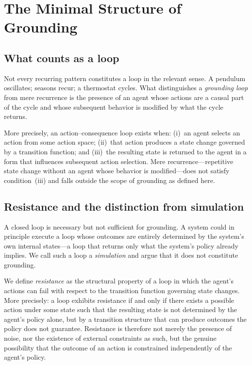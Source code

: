 \documentclass[11pt]{article}
\begin{document}
\section{The Minimal Structure of Grounding}
\label{sec:structure}

\subsection{What counts as a loop}
\label{sec:loop}

Not every recurring pattern constitutes a loop in the relevant sense.
A pendulum oscillates; seasons recur; a thermostat cycles. What
distinguishes a \emph{grounding loop} from mere recurrence is the
presence of an agent whose actions are a causal part of the cycle and
whose subsequent behavior is modified by what the cycle returns.

More precisely, an action--consequence loop exists when: (i)~an
agent selects an action from some action space; (ii)~that action
produces a state change governed by a transition function; and
(iii)~the resulting state is returned to the agent in a form that
influences subsequent action selection. Mere recurrence---repetitive
state change without an agent whose behavior is modified---does not
satisfy condition~(iii) and falls outside the scope of grounding as
defined here.

\subsection{Resistance and the distinction from simulation}
\label{sec:resistance}

A closed loop is necessary but not sufficient for grounding. A system
could in principle execute a loop whose outcomes are entirely
determined by the system's own internal states---a loop that returns
only what the system's policy already implies. We call such a loop a
\emph{simulation} and argue that it does not constitute grounding.

We define \emph{resistance} as the structural property of a loop in
which the agent's actions can fail with respect to the transition
function governing state changes. More precisely: a loop exhibits
resistance if and only if there exists a possible action under some
state such that the resulting state is not determined by the agent's
policy alone, but by a transition structure that can produce outcomes
the policy does not guarantee. Resistance is therefore not merely the
presence of noise, nor the existence of external constraints as such,
but the genuine possibility that the outcome of an action is
constrained independently of the agent's policy.
\end{document}
